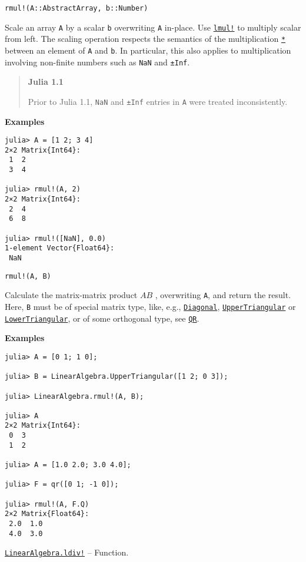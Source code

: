 \begin{adjustwidth}{2em}{0pt}


\begin{verbatim}
rmul!(A::AbstractArray, b::Number)
\end{verbatim}

Scale an array \texttt{A} by a scalar \texttt{b} overwriting \texttt{A} in-place.  Use \hyperlink{12404459690324241452}{\texttt{lmul!}} to multiply scalar from left.  The scaling operation respects the semantics of the multiplication \hyperlink{5498506958944335098}{\texttt{*}} between an element of \texttt{A} and \texttt{b}.  In particular, this also applies to multiplication involving non-finite numbers such as \texttt{NaN} and \texttt{±Inf}.

\begin{quote}
\textbf{Julia 1.1}

Prior to Julia 1.1, \texttt{NaN} and \texttt{±Inf} entries in \texttt{A} were treated inconsistently.

\end{quote}
\textbf{Examples}


\begin{verbatim}
julia> A = [1 2; 3 4]
2×2 Matrix{Int64}:
 1  2
 3  4

julia> rmul!(A, 2)
2×2 Matrix{Int64}:
 2  4
 6  8

julia> rmul!([NaN], 0.0)
1-element Vector{Float64}:
 NaN
\end{verbatim}




\begin{lstlisting}
rmul!(A, B)
\end{lstlisting}

Calculate the matrix-matrix product  \(AB\) , overwriting \texttt{A}, and return the result. Here, \texttt{B} must be of special matrix type, like, e.g., \hyperlink{3300114559258360989}{\texttt{Diagonal}}, \hyperlink{6344726545165008167}{\texttt{UpperTriangular}} or \hyperlink{15116078732779234709}{\texttt{LowerTriangular}}, or of some orthogonal type, see \hyperlink{16913872014958777367}{\texttt{QR}}.

\textbf{Examples}


\begin{verbatim}
julia> A = [0 1; 1 0];

julia> B = LinearAlgebra.UpperTriangular([1 2; 0 3]);

julia> LinearAlgebra.rmul!(A, B);

julia> A
2×2 Matrix{Int64}:
 0  3
 1  2

julia> A = [1.0 2.0; 3.0 4.0];

julia> F = qr([0 1; -1 0]);

julia> rmul!(A, F.Q)
2×2 Matrix{Float64}:
 2.0  1.0
 4.0  3.0
\end{verbatim}



\end{adjustwidth}
\hypertarget{11817740014578453690}{}
\hyperlink{11817740014578453690}{\texttt{LinearAlgebra.ldiv!}}  -- {Function.}

